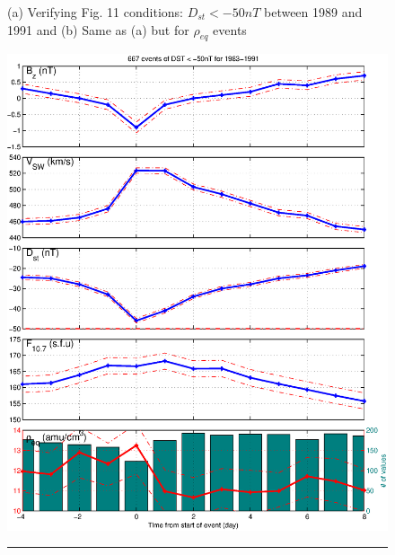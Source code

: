 \documentclass[10pt,twocolumn]{article}
\begin{document}
\begin{figure}[htp!]
\caption{(a) Verifying \cite{Takahashi2010} Fig. 11 conditions: $D_{st}<-50nT$ between 1989 and 1991 and (b) Same as (a) but for $\rho_{eq}$ events}
\label{DailyAverages}
\end{figure}

\begin{figure}[htp!]
\centering
\includegraphics[scale=0.45]{paperfigures/stormavs-dst-day.eps}
\rule[1ex]{5cm}{0.5pt}

\end{figure}
\end{document}
